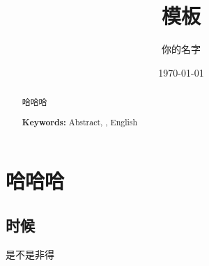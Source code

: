 \documentclass[UTF8,a4paper,10pt]{ctexart}
\begin{document}
\title{模板}
\author{你的名字}
\date{\today}
\maketitle
\begin{abstract}
	哈哈哈
	
\textbf{Keywords:} Abstract, \LaTeXe, English

\end{abstract}



\newpage
\tableofcontents
\newpage

\section{哈哈哈}

\subsection{时候}
是不是非得
\end{document}

